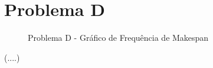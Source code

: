 \section{Problema D}
\begin{figure}
    \caption{Problema D - Gráfico de Frequência de Makespan}
    \label{fig:plobD-freq-mk}
    \begin{minipage}{.5\linewidth}
        \centering
        \subfloat[]{
            \label{plobD-freq-mk:a}
            \resizebox{\linewidth}{!}{}
        }
    \end{minipage}%
    \begin{minipage}{.5\linewidth}
        \centering
        \subfloat[]{
            \label{plobD-freq-mk:b}
            \resizebox{\linewidth}{!}{}
        }
    \end{minipage}\par\medskip
      \centering
      \subfloat[]{
        \label{plobD-freq-mk:c}
        \resizebox{.5\linewidth}{!}{}
      }
\end{figure}
(....)
